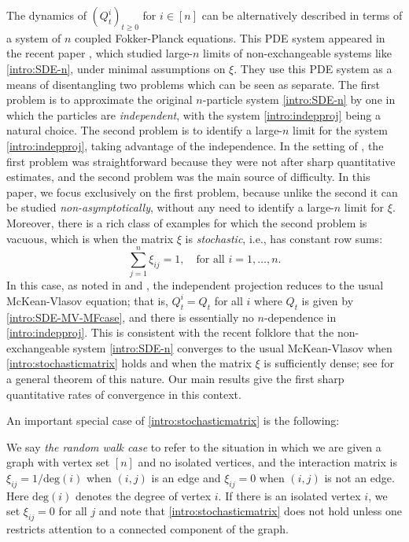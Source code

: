 \documentclass[11pt,reqno]{amsart}
\numberwithin{equation}{section}
\theoremstyle{definition}
\begin{document}
 
The dynamics of $(Q^i_t)_{t \ge 0}$ for $i \in [n]$ can be alternatively described in terms of a system of  $n$ coupled Fokker-Planck equations. This PDE system appeared in the recent paper \cite{jabin2021mean}, which studied large-$n$ limits of non-exchangeable systems like \eqref{intro:SDE-n}, under minimal assumptions on $\xi$.
They use this PDE system as a means of disentangling two problems which can be seen as separate. The first problem is to approximate the original $n$-particle system \eqref{intro:SDE-n} by one in which  the particles are \emph{independent}, with the system \eqref{intro:indepproj} being a natural choice.  The second problem is to identify a large-$n$ limit  for the    system \eqref{intro:indepproj}, taking advantage of the independence.
In the setting of \cite{jabin2021mean}, the first problem was straightforward because they were not after sharp quantitative estimates, and the second problem was the main source of difficulty.
In this paper, we focus exclusively on the first problem, because unlike the second it can be studied \emph{non-asymptotically}, without any need to identify a large-$n$ limit for $\xi$.
Moreover, there is a rich class of examples for which the second problem is vacuous, which is when the matrix $\xi$ is \emph{stochastic}, i.e., has constant row sums:
\begin{equation}
\sum_{j=1}^n\xi_{ij} =1, \quad \text{for all } i=1,\ldots,n. \label{intro:stochasticmatrix}
\end{equation}
In this case, as  noted in \cite[Remark 2.3]{jabin2021mean} and \cite[Remark 2.7]{lacker2023independent}, the independent projection reduces to the usual McKean-Vlasov equation; that is, $Q^i_t=Q_t$ for all $i$ where $Q_t$ is given by \eqref{intro:SDE-MV-MFcase}, and there is essentially no $n$-dependence  in \eqref{intro:indepproj}.
This is consistent with the recent folklore that the non-exchangeable system \eqref{intro:SDE-n} converges to the usual McKean-Vlasov when \eqref{intro:stochasticmatrix} holds and when the matrix $\xi$ is sufficiently dense; see
\cite{oliveira2019interacting} for a general theorem of this nature.
Our main results give the first sharp quantitative rates of convergence in this context.

An important special case of \eqref{intro:stochasticmatrix} is the following:


\begin{definition} \label{def:randomwalk-case}
We say \emph{the random walk case} to refer to the situation in which we are given a graph with vertex set $[n]$ and no isolated vertices, and the interaction matrix is $\xi_{ij}=1/\mathrm{deg}(i)$ when $(i,j)$ is an edge and $\xi_{ij}=0$ when $(i,j)$ is not an edge. Here $\mathrm{deg}(i)$ denotes the degree of vertex $i$.
If there is an isolated vertex $i$, we set $\xi_{ij}=0$ for all $j$ and note that \eqref{intro:stochasticmatrix}  does not hold unless one restricts attention to a connected component of the graph.
\end{definition}
\end{document}
